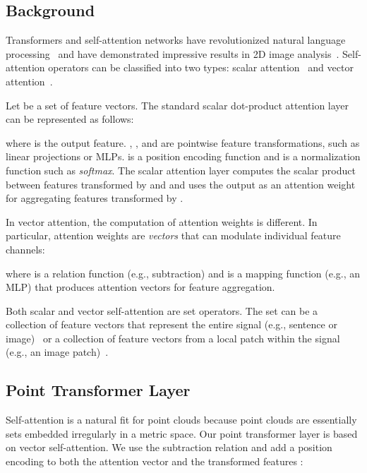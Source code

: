 \documentclass[final]{cvpr}
\begin{document}
\subsection{Background}

Transformers and self-attention networks have revolutionized natural language processing~\cite{vaswani2017attention,wu2019pay,Devlin2018,dai2019transformer,Yang2019xlnet} and have demonstrated impressive results in 2D image analysis~\cite{hu2019local,ramachandran2019stand,zhao2020san,dosovitskiy2020image}. Self-attention operators can be classified into two types: scalar attention~\cite{vaswani2017attention} and vector attention~\cite{zhao2020san}.

Let  be a set of feature vectors. The standard scalar dot-product attention layer can be represented as follows:

where  is the output feature.
, , and  are pointwise feature transformations, such as linear projections or MLPs.  is a position encoding function and  is a normalization function such as \textit{softmax}. The scalar attention layer computes the scalar product between features transformed by  and  and uses the output as an attention weight for aggregating features transformed by .

In vector attention, the computation of attention weights is different. In particular, attention weights are \emph{vectors} that can modulate individual feature channels:

where  is a relation function (e.g., subtraction) and  is a mapping function (e.g., an MLP) that produces attention vectors for feature aggregation.

Both scalar and vector self-attention are set operators. The set can be a collection of feature vectors that represent the entire signal (e.g., sentence or image)~\cite{vaswani2017attention,dosovitskiy2020image} or a collection of feature vectors from a local patch within the signal (e.g., an image patch)~\cite{hu2019local,ramachandran2019stand,zhao2020san}.

\subsection{Point Transformer Layer}
\label{sec:layer}

Self-attention is a natural fit for point clouds because point clouds are essentially sets embedded irregularly in a metric space. Our point transformer layer is based on vector self-attention. We use the subtraction relation and add a position encoding  to both the attention vector  and the transformed features :
\end{document}

